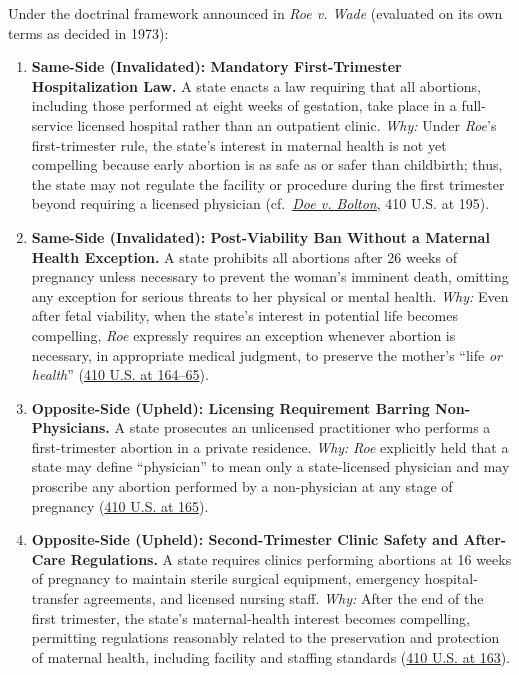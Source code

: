 \documentclass[12pt]{article}
\begin{document}
Under the doctrinal framework announced in \textit{Roe v. Wade} (evaluated on its own terms as decided in 1973):
\begin{enumerate}
\item \textbf{Same-Side (Invalidated): Mandatory First-Trimester Hospitalization Law.} A state enacts a law requiring that all abortions, including those performed at eight weeks of gestation, take place in a full-service licensed hospital rather than an outpatient clinic. \textit{Why:} Under \textit{Roe}'s first-trimester rule, the state's interest in maternal health is not yet compelling because early abortion is as safe as or safer than childbirth; thus, the state may not regulate the facility or procedure during the first trimester beyond requiring a licensed physician (cf.\ \href{https://supreme.justia.com/cases/federal/us/410/179/}{\textit{Doe v. Bolton}}, 410 U.S. at 195).
\item \textbf{Same-Side (Invalidated): Post-Viability Ban Without a Maternal Health Exception.} A state prohibits all abortions after 26 weeks of pregnancy unless necessary to prevent the woman's imminent death, omitting any exception for serious threats to her physical or mental health. \textit{Why:} Even after fetal viability, when the state's interest in potential life becomes compelling, \textit{Roe} expressly requires an exception whenever abortion is necessary, in appropriate medical judgment, to preserve the mother's ``life \textit{or health}'' (\href{https://supreme.justia.com/cases/federal/us/410/113/}{410 U.S. at 164--65}).
\item \textbf{Opposite-Side (Upheld): Licensing Requirement Barring Non-Physicians.} A state prosecutes an unlicensed practitioner who performs a first-trimester abortion in a private residence. \textit{Why:} \textit{Roe} explicitly held that a state may define ``physician'' to mean only a state-licensed physician and may proscribe any abortion performed by a non-physician at any stage of pregnancy (\href{https://supreme.justia.com/cases/federal/us/410/113/}{410 U.S. at 165}).
\item \textbf{Opposite-Side (Upheld): Second-Trimester Clinic Safety and After-Care Regulations.} A state requires clinics performing abortions at 16 weeks of pregnancy to maintain sterile surgical equipment, emergency hospital-transfer agreements, and licensed nursing staff. \textit{Why:} After the end of the first trimester, the state's maternal-health interest becomes compelling, permitting regulations reasonably related to the preservation and protection of maternal health, including facility and staffing standards (\href{https://supreme.justia.com/cases/federal/us/410/113/}{410 U.S. at 163}).

\end{enumerate}
\end{document}
